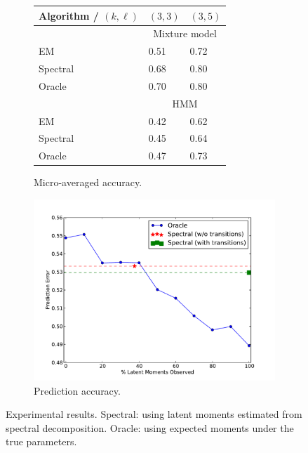\begin{figure}
  \centering
  \begin{subfigure}[b]{0.4\textwidth}
    \begin{tabular}{l | l l }
        Algorithm / $(k,\ell)$ & $(3,3)$ & $(3,5)$ \\ \hline
        & \multicolumn{2}{c}{Mixture model} \\
        EM                    & 0.51 & 0.72 \\
        Spectral              & 0.68 & 0.80 \\
        Oracle                & 0.70 & 0.80 \\ \hline
        & \multicolumn{2}{c}{HMM} \\
        EM                    & 0.42 & 0.62  \\
        Spectral              & 0.45 & 0.64  \\
        Oracle                & 0.47 & 0.73
    \end{tabular}
    \caption{Micro-averaged accuracy.}
    \label{tab:errors}
  \end{subfigure}
  \begin{subfigure}[b]{0.4\textwidth}
    \includegraphics[width=1.0\textwidth]{figures/measurements.pdf}
    \caption{Prediction accuracy.}
    \label{fig:measurements}
  \end{subfigure}
  \caption{Experimental results.  Spectral: using latent moments estimated from
  spectral decomposition.  Oracle: using expected moments under the true
  parameters.}
\end{figure}

